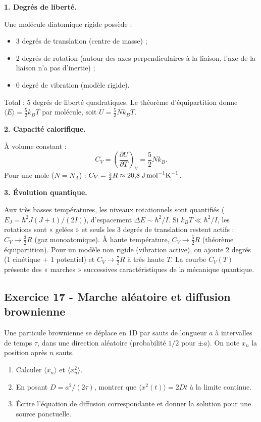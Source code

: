 \documentclass[12pt,a4paper]{article}
\begin{document}
\begin{boitecorrige}

\textbf{1. Degrés de liberté.}

Une molécule diatomique rigide possède :
\begin{itemize}[nosep]
  \item 3 degrés de translation (centre de masse) ;
  \item 2 degrés de rotation (autour des axes perpendiculaires à la liaison, l'axe de la liaison n'a pas d'inertie) ;
  \item 0 degré de vibration (modèle rigide).
\end{itemize}
Total : 5 degrés de liberté quadratiques. Le théorème d'équipartition donne $\langle E\rangle = \tfrac{5}{2}k_BT$ par molécule, soit $U = \tfrac{5}{2}Nk_BT$.

\textbf{2. Capacité calorifique.}

À volume constant :
\[
C_V = \left(\frac{\partial U}{\partial T}\right)_V = \frac{5}{2}Nk_B.
\]
Pour une mole ($N = N_A$) : $C_V = \tfrac{5}{2}R \approx 20{,}8\;\text{J\,mol}^{-1}\text{K}^{-1}$.

\textbf{3. Évolution quantique.}

Aux très basses températures, les niveaux rotationnels sont quantifiés ($E_J = \hbar^2 J(J+1)/(2I)$), d'espacement $\Delta E \sim \hbar^2/I$. Si $k_BT \ll \hbar^2/I$, les rotations sont « gelées » et seuls les 3 degrés de translation restent actifs : $C_V \to \tfrac{3}{2}R$ (gaz monoatomique). À haute température, $C_V \to \tfrac{5}{2}R$ (théorème équipartition). Pour un modèle non rigide (vibration active), on ajoute 2 degrés (1 cinétique + 1 potentiel) et $C_V \to \tfrac{7}{2}R$ à très haute $T$. La courbe $C_V(T)$ présente des « marches » successives caractéristiques de la mécanique quantique.

\end{boitecorrige}

\subsection*{Exercice 17 - Marche aléatoire et diffusion brownienne \niveau{\moyen}}

\begin{boiteexercice}
Une particule brownienne se déplace en 1D par sauts de longueur $a$ à intervalles de temps $\tau$, dans une direction aléatoire (probabilité $1/2$ pour $\pm a$). On note $x_n$ la position après $n$ sauts.
\begin{enumerate}
  \item Calculer $\langle x_n\rangle$ et $\langle x_n^2\rangle$.
  \item En posant $D = a^2/(2\tau)$, montrer que $\langle x^2(t)\rangle = 2Dt$ à la limite continue.
  \item Écrire l'équation de diffusion correspondante et donner la solution pour une source ponctuelle.
\end{enumerate}
\end{boiteexercice}
\end{document}
